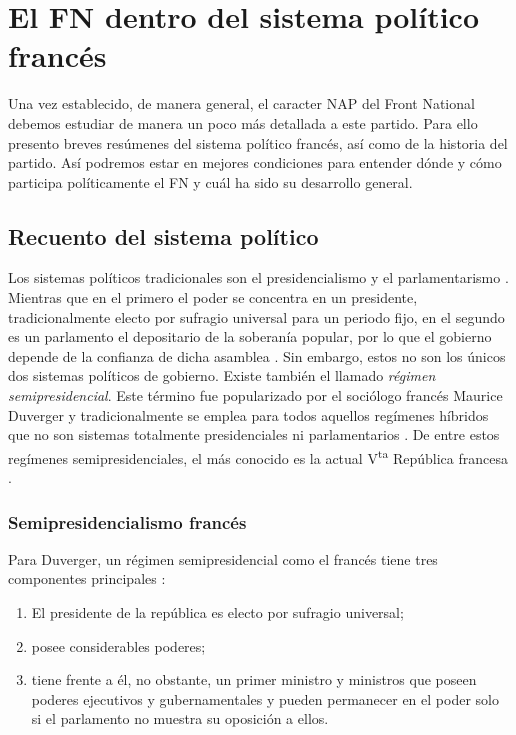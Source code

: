 \chapter{El FN dentro del sistema político francés}

Una vez establecido, de manera general, el caracter NAP del Front National debemos estudiar de manera un poco más detallada a este partido. Para ello presento breves resúmenes del sistema político francés, así como de la historia del partido. Así podremos estar en mejores condiciones para entender dónde y cómo participa políticamente el FN y cuál ha sido su desarrollo general. 

\section{Recuento del sistema político}

Los sistemas políticos tradicionales son el presidencialismo y el parlamentarismo \parencites[12]{Carpizo04}[39]{Veser99}. Mientras que en el primero el poder se concentra en un presidente, tradicionalmente electo por sufragio universal para un periodo fijo, en el segundo es un parlamento el depositario de la soberanía popular, por lo que el gobierno depende de la confianza de dicha asamblea \parencite[52]{Linz90}. Sin embargo, estos no son los únicos dos sistemas políticos de gobierno. Existe también el llamado \textit{régimen semipresidencial}. Este término fue popularizado por el sociólogo francés Maurice Duverger y tradicionalmente se emplea para todos aquellos regímenes híbridos que no son sistemas totalmente  presidenciales ni parlamentarios \parencites{Veser99}[7]{Carpizo04}[52]{Linz90}. De entre estos regímenes semipresidenciales, el más conocido es la actual V\textsuperscript{ta} República francesa \parencite[7]{Carpizo04}.\\

\subsection{Semipresidencialismo francés}

Para Duverger, un régimen semipresidencial como el francés tiene tres componentes principales \parencite[42]{Veser99}:

\begin{enumerate}
\item El presidente de la república es electo por sufragio universal;
\item posee considerables poderes;
\item tiene frente a él, no obstante, un primer ministro y ministros que poseen poderes ejecutivos y gubernamentales y pueden permanecer en el poder solo si el parlamento no muestra su oposición a ellos.
\end{enumerate}

